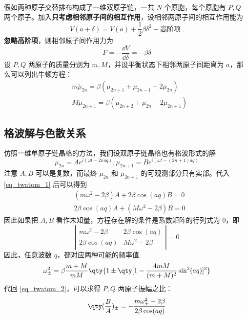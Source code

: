 
假如两种原子交替排布构成了一维双原子链，一共 $N$ 个原胞，每个原胞有 $P,Q$ 两个原子。加入\textbf{只考虑相邻原子间的相互作用}，设相邻两原子间的相互作用能为
\begin{equation}
V(a+\delta)=V(a)+\frac{1}{2}\beta \delta^2+\text{高阶项}~.
\end{equation}
\textbf{忽略高阶项}，则相邻原子间作用力为
\begin{equation}
F=-\frac{\dd V}{\dd \delta}=-\beta \delta
\end{equation}
设 $P,Q$ 两原子的质量分别为 $m,M$，并设平衡状态下相邻两原子间距离为 $a$，那么可以列出牛顿方程：
\begin{equation}\label{eq_twatom_1}
\begin{aligned}
&m\ddot \mu_{2n}=\beta(\mu_{2n+1}+\mu_{2n-1}-2\mu_{2n})\\
&M\ddot \mu_{2n+1}=\beta(\mu_{2n+2}+\mu_{2n}-2\mu_{2n+1})
\end{aligned}
\end{equation}
\subsection{格波解与色散关系}
仿照一维单原子链晶格的方法，我们设双原子链晶格也有格波形式的解
\begin{equation}\label{eq_twatom_3}
\mu_{2n}=A e^{i(\omega t - 2naq)},\mu_{2n+1}=B  e^{i(\omega t - (2n+1)aq)}
\end{equation}
注意 $A,B$ 可以是复数，而最终 $\mu_{2n}$ 和 $\mu_{2n+1}$ 的可观测部分只有实部。代入\autoref{eq_twatom_1} 后可以得到
\begin{equation}\label{eq_twatom_2}
\begin{aligned}
&(m\omega^2-2\beta)A+2\beta\cos(aq)B=0\\
&2\beta\cos(aq)A+(M\omega^2-2\beta)B=0
\end{aligned}
\end{equation}
因此如果把 $A,B$ 看作未知量，方程存在解的条件是系数矩阵的行列式为 $0$，即
\begin{equation}
\left|
\begin{matrix}
m\omega^2-2\beta&2\beta\cos(aq)\\
2\beta\cos(aq)&M\omega^2-2\beta
\end{matrix}
\right|=0
\end{equation}
因此，任意波数 $q$，都对应两种可能的频率值
\begin{equation}
\omega_{\pm}^2=\beta\frac{m+M}{mM}\qty{1\pm \qty[1-\frac{4mM}{(m+M)^2}\sin^2(aq)]^2}
\end{equation}
代回 \autoref{eq_twatom_2}，可以求得 $P,Q$ 两原子振幅之比：
\begin{equation}\label{eq_twatom_4}
\qty(\frac{B}{A})_{\pm}=-\frac{m\omega_{\pm}^2-2\beta}{2\beta\cos(aq)}
\end{equation}

